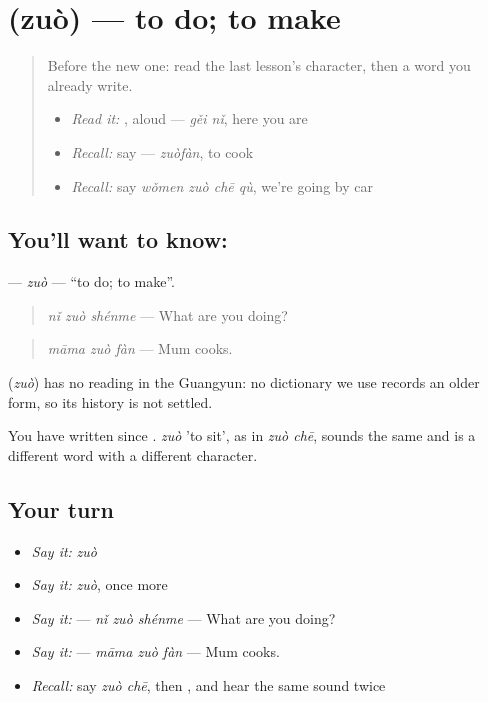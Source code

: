 \section[\texorpdfstring{\zh{做} (zuò)}{做 (zuò)}]{ (zuò) — to do; to make}

\label{lesson:ZH-C89-zuo}



\begin{quote}
Before the new one: read the last lesson's character, then a word you already write.

\begin{itemize}
\raggedright
  \item \emph{Read it:} , aloud — \emph{gěi nǐ}, here you are
  \item \emph{Recall:} say  — \emph{zuòfàn}, to cook
  \item \emph{Recall:} say \emph{wǒmen zuò chē qù}, we're going by car
\end{itemize}
\end{quote}

\subsection*{You'll want to know: }
\textbf{} — \emph{zuò} — \textquotedblleft{}to do; to make\textquotedblright{}.

\begin{quote}
\textbf{} \emph{nǐ zuò shénme} — What are you doing?
\end{quote}

\begin{quote}
\textbf{} \emph{māma zuò fàn} — Mum cooks.
\end{quote}

\begin{cousinweb}
\textbf{} (\emph{zuò}) has no reading in the Guangyun: no dictionary we use records an older form, so its history is not settled.
\end{cousinweb}

\begin{grammarlens}[title={What you've built}]
You have written  since . \emph{zuò} 'to sit', as in \emph{zuò chē}, sounds the same and is a different word with a different character.
\end{grammarlens}

\subsection*{Your turn}
\begin{itemize}
\raggedright
  \item \emph{Say it:} \emph{zuò}
  \item \emph{Say it:} \emph{zuò}, once more
  \item \emph{Say it:}  — \emph{nǐ zuò shénme} — What are you doing?
  \item \emph{Say it:}  — \emph{māma zuò fàn} — Mum cooks.
  \item \emph{Recall:} say \emph{zuò chē}, then , and hear the same sound twice
\end{itemize}

